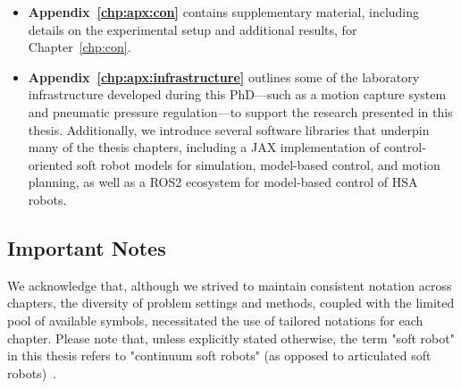 \begin{itemize}
    \item \textbf{Appendix~\ref{chp:apx:con}} contains supplementary material, including details on the experimental setup and additional results, for Chapter~\ref{chp:con}.
    \item 
    \textbf{Appendix~\ref{chp:apx:infrastructure}} outlines some of the laboratory infrastructure developed during this PhD—such as a motion capture system and pneumatic pressure regulation—to support the research presented in this thesis. Additionally, we introduce several software libraries that underpin many of the thesis chapters, including a JAX implementation of control-oriented soft robot models for simulation, model-based control, and motion planning, as well as a ROS2 ecosystem for model-based control of \gls{HSA} robots.
\end{itemize}
 

\subsection{Important Notes}
We acknowledge that, although we strived to maintain consistent notation across chapters, the diversity of problem settings and methods, coupled with the limited pool of available symbols, necessitated the use of tailored notations for each chapter.
Please note that, unless explicitly stated otherwise, the term "soft robot" in this thesis refers to "continuum soft robots" (as opposed to articulated soft robots)~\citep{della2020softencyclopedia}.